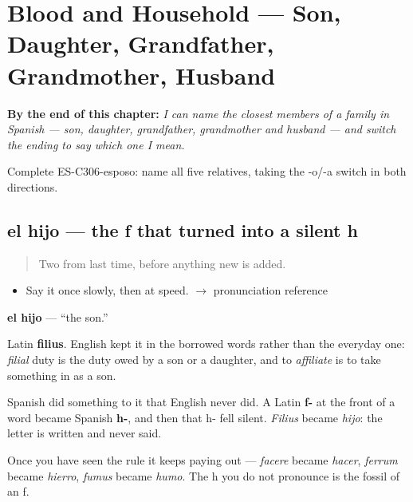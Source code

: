 
\chapter{Blood and Household --- Son, Daughter, Grandfather, Grandmother, Husband}
\label{ch:hijos-y-abuelos}

\begin{chapteropening}
\textbf{By the end of this chapter:} \emph{I can name the closest members of a family in Spanish --- son, daughter, grandfather, grandmother and husband --- and switch the ending to say which one I mean.}

Complete ES-C306-esposo: name all five relatives, taking the -o/-a switch in both directions.
\end{chapteropening}

\section[el hijo]{el hijo --- the f that turned into a silent h}

\label{lesson:ES-C306-hijo}



\begin{quote}
Two from last time, before anything new is added.
\end{quote}

\begin{sounds}
\begin{itemize}
\raggedright
  \item Say it once slowly, then at speed. $\to$ pronunciation reference
\end{itemize}
\end{sounds}

\begin{cousinweb}
\textbf{el hijo} --- \textquotedblleft{}the son.\textquotedblright{}

Latin \textbf{filius}. English kept it in the borrowed words rather than the everyday one: \emph{filial} duty is the duty owed by a son or a daughter, and to \emph{affiliate} is to take something in as a son.

Spanish did something to it that English never did. A Latin \textbf{f-} at the front of a word became Spanish \textbf{h-}, and then that h- fell silent. \emph{Filius} became \emph{hijo}: the letter is written and never said.

Once you have seen the rule it keeps paying out --- \emph{facere} became \emph{hacer}, \emph{ferrum} became \emph{hierro}, \emph{fumus} became \emph{humo}. The h you do not pronounce is the fossil of an f.
\end{cousinweb}

